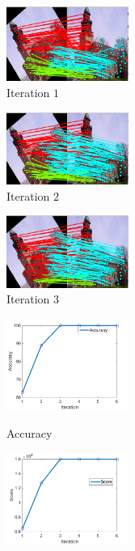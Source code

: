 \begin{figure} \centering
		\begin{subfigure}[b]{0.32\textwidth}
			\centering
			\includegraphics[width=4cm]{"chapter3/fig/ImageTrafo/sIterations/It1"} 
			\caption{Iteration $1$}
		\end{subfigure}
		\begin{subfigure}[b]{0.32\textwidth}
			\centering
			\includegraphics[width=4cm]{"chapter3/fig/ImageTrafo/sIterations/It2"} 
			\caption{Iteration $2$}
		\end{subfigure} 
		\begin{subfigure}[b]{0.32\textwidth}
			\centering
			\includegraphics[width=4cm]{"chapter3/fig/ImageTrafo/sIterations/It3"}
			\caption{Iteration $3$}
		\end{subfigure} 	
		\begin{subfigure}[b]{0.33\textwidth}
			\centering
			\includegraphics[width=4cm]{"chapter3/fig/ImageTrafo/sIterations/accuracy"} \label{fig:ImageTrafo_sIterations_e}
			\caption{Accuracy}
		\end{subfigure} 
		\begin{subfigure}[b]{0.33\textwidth}
			\centering
			\includegraphics[width=4cm]{"chapter3/fig/ImageTrafo/sIterations/score"} \label{fig:ImageTrafo_sIterations_d}

\end{subfigure}
\end{figure}
